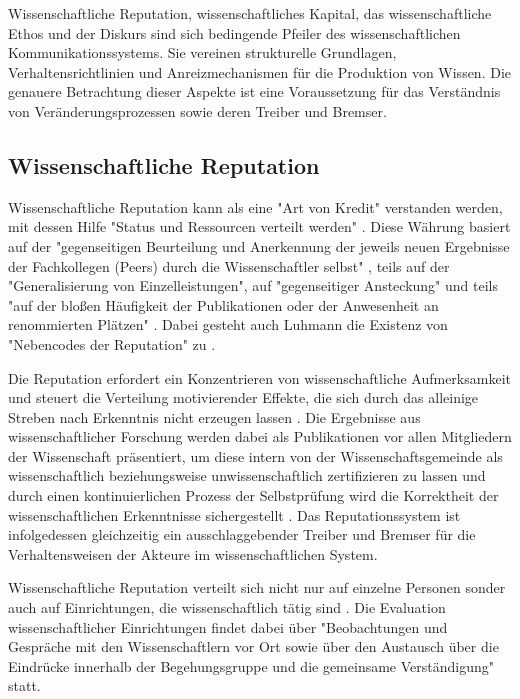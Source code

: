 Wissenschaftliche Reputation, wissenschaftliches Kapital, das wissenschaftliche Ethos und der Diskurs sind sich bedingende Pfeiler des wissenschaftlichen Kommunikationssystems. Sie vereinen strukturelle Grundlagen, Verhaltensrichtlinien und Anreizmechanismen für die Produktion von Wissen. Die genauere Betrachtung dieser Aspekte ist eine Voraussetzung für das Verständnis von Veränderungsprozessen sowie deren Treiber und Bremser.

\subsection{Wissenschaftliche Reputation}

Wissenschaftliche Reputation kann als eine "Art von Kredit" \cite{Luhmann_1970} verstanden werden, mit dessen Hilfe "Status und Ressourcen verteilt werden" \cite{Hanekop_2006}. Diese Währung basiert auf der "gegenseitigen Beurteilung und Anerkennung der jeweils neuen Ergebnisse der Fachkollegen (Peers) durch die Wissenschaftler selbst" \cite{Hanekop_2014} \cite{Neidhardt_2006}, teils auf der "Generalisierung von Einzelleistungen", auf "gegenseitiger Ansteckung" und teils "auf der bloßen Häufigkeit der Publikationen oder der Anwesenheit an renommierten Plätzen" \cite{Luhmann_1970}. Dabei gesteht auch Luhmann die Existenz von "Nebencodes der Reputation" zu \cite{Schmoch_2003}.

Die Reputation erfordert ein Konzentrieren von wissenschaftliche Aufmerksamkeit und steuert die Verteilung motivierender Effekte, die sich durch das alleinige Streben nach Erkenntnis nicht erzeugen lassen \cite{Luhmann_1998}. Die Ergebnisse aus wissenschaftlicher Forschung werden dabei als Publikationen vor allen Mitgliedern der Wissenschaft präsentiert, um diese intern von der Wissenschaftsgemeinde als wissenschaftlich beziehungsweise unwissenschaftlich zertifizieren zu lassen \cite[:47]{Rutenfranz_1997} und durch einen kontinuierlichen Prozess der Selbstprüfung wird die Korrektheit der wissenschaftlichen Erkenntnisse sichergestellt \cite{Edsall_1976}. Das Reputationssystem ist infolgedessen gleichzeitig ein ausschlaggebender Treiber und Bremser für die Verhaltensweisen der Akteure im wissenschaftlichen System.

Wissenschaftliche Reputation verteilt sich nicht nur auf einzelne Personen sonder auch auf Einrichtungen, die wissenschaftlich tätig sind \cite[:13]{Buss_2001}. Die Evaluation wissenschaftlicher Einrichtungen findet dabei über "Beobachtungen und Gespräche mit den Wissenschaftlern vor Ort sowie über den Austausch über die Eindrücke innerhalb der Begehungsgruppe und die gemeinsame Verständigung" \cite{Barloesius_2008} statt.

